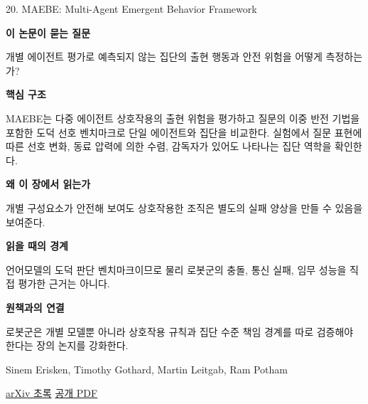 \documentclass[11pt,openany]{book}
\begin{document}
\begin{termcard}{20. MAEBE: Multi-Agent Emergent Behavior Framework}

\par

\medskip

{\sffamily\bfseries\color{deepblue} 이 논문이 묻는 질문}\par

개별 에이전트 평가로 예측되지 않는 집단의 출현 행동과 안전 위험을 어떻게 측정하는가?

\smallskip

{\sffamily\bfseries\color{deepblue} 핵심 구조}\par

MAEBE는 다중 에이전트 상호작용의 출현 위험을 평가하고 질문의 이중 반전 기법을 포함한 도덕 선호 벤치마크로 단일 에이전트와 집단을 비교한다. 실험에서 질문 표현에 따른 선호 변화, 동료 압력에 의한 수렴, 감독자가 있어도 나타나는 집단 역학을 확인한다.

\smallskip

{\sffamily\bfseries\color{deepblue} 왜 이 장에서 읽는가}\par

개별 구성요소가 안전해 보여도 상호작용한 조직은 별도의 실패 양상을 만들 수 있음을 보여준다.

\smallskip

{\sffamily\bfseries\color{coral} 읽을 때의 경계}\par

언어모델의 도덕 판단 벤치마크이므로 물리 로봇군의 충돌, 통신 실패, 임무 성능을 직접 평가한 근거는 아니다.

\smallskip

{\sffamily\bfseries\color{teal} 원책과의 연결}\par

로봇군은 개별 모델뿐 아니라 상호작용 규칙과 집단 수준 책임 경계를 따로 검증해야 한다는 장의 논지를 강화한다.

\medskip

{\footnotesize\color{muted} Sinem Erisken, Timothy Gothard, Martin Leitgab, Ram Potham\par

\href{https://arxiv.org/abs/2506.03053}{arXiv 초록} \quad \href{https://arxiv.org/pdf/2506.03053}{공개 PDF}\par}

\end{termcard}
\end{document}
